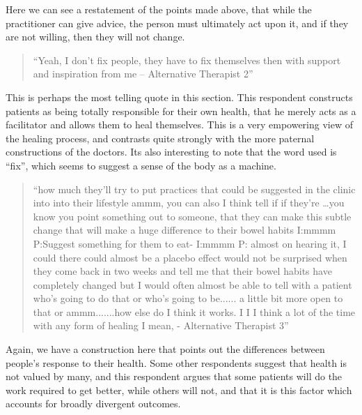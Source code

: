 Here we can see a restatement of the points made above, that while the practitioner can give advice, the person must ultimately act upon it, and if they are not willing, then they will not change. 

\begin{quotation}
``Yeah, I don't fix people, they have to fix themselves then with support and inspiration from me – Alternative Therapist 2''  
\end{quotation}


This is perhaps the most telling quote in this section. This respondent constructs patients as being totally responsible for their own health, that he merely acts as a facilitator and allows them to heal themselves. This is a very empowering view of the healing process, and contrasts quite strongly with the more paternal constructions of the doctors. Its also interesting to note that the word used is ``fix'', which seems to suggest a sense of the body as a machine. 

\begin{quotation}
``how much they'll try to put practices that could be suggested in the clinic into into their lifestyle ammm, you can also I think tell if if they're \ldots you know you point something out to someone, that they can make this subtle  change that will make a huge difference to their bowel habits  
I:mmmm
P:Suggest something for them to eat-
I:mmmm
P: almost on hearing it, I could there could almost be a placebo effect would not be surprised when they come back in two weeks and tell me that their bowel habits have completely changed but I would often almost be able to tell with a patient who's going to do that or who's going to be...... a little bit more open to that or ammm.......how else do I think it works. I I I think a lot of the time with any form of healing I mean, - Alternative Therapist 3''  
\end{quotation}


Again, we have a construction here that points out the differences between people's response to their health. Some other respondents suggest that health is not valued by many, and this respondent argues that some patients will do the work required to get better, while others will not, and that it is this factor which accounts for broadly divergent outcomes. 

